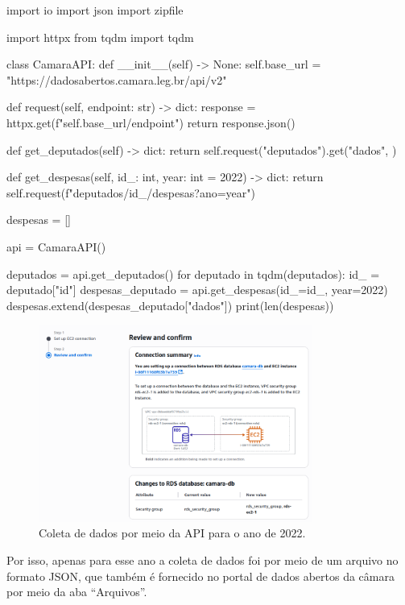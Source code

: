 \documentclass[12pt, a4paper]{article}
\begin{document}
\begin{python}
import io
import json
import zipfile

import httpx
from tqdm import tqdm

class CamaraAPI:
	def __init__(self) -> None:
		self.base_url = "https://dadosabertos.camara.leg.br/api/v2"
	
	def request(self, endpoint: str) -> dict:
		response = httpx.get(f"{self.base_url}/{endpoint}")
		return response.json()
	
	def get_deputados(self) -> dict:
		return self.request("deputados").get("dados", {})
	
	def get_despesas(self, id_: int, year: int = 2022) -> dict:
		return self.request(f"deputados/{id_}/despesas?ano={year}")

despesas = []

api = CamaraAPI()

deputados = api.get_deputados()
for deputado in tqdm(deputados):
	id_ = deputado["id"]
	despesas_deputado = api.get_despesas(id_=id_, year=2022)
	despesas.extend(despesas_deputado["dados"])
print(len(despesas))
\end{python}


\begin{figure}[h]
    \centering
    \includegraphics[width=0.8\textwidth]{assets/1.png} 
    \caption{Coleta de dados por meio da API para o ano de 2022.}
    \label{fig:api_2022}
\end{figure}

Por isso, apenas para esse ano a coleta de dados foi por meio de um arquivo no formato JSON, que também é fornecido no portal de dados abertos da câmara por meio da aba “Arquivos”.
\end{document}
